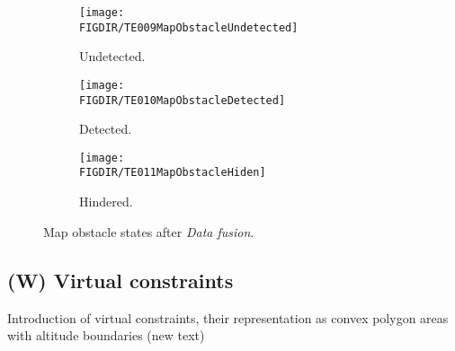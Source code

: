     
    \begin{figure}[H]
        \begin{subfigure}{0.32\textwidth}
            \texttt{[image: \\FIGDIR/TE009MapObstacleUndetected]} 
            \caption{Undetected.}
            \label{fig:undetectedMapObstalce.}
        \end{subfigure}
        \begin{subfigure}{0.32\textwidth}
            \texttt{[image: \\FIGDIR/TE010MapObstacleDetected]} 
            \caption{Detected.}
            \label{fig:detectedMapObstacle}
        \end{subfigure}
        \begin{subfigure}{0.32\textwidth}
            \texttt{[image: \\FIGDIR/TE011MapObstacleHiden]}
            \caption{Hindered.}
            \label{fig:hinderedMapObstacle}
        \end{subfigure}
        \caption{Map obstacle states after \emph{Data fusion}.}
        \label{fig:mapObstacleStatesAfterDataFusion}
    \end{figure}

\subsection{(W) Virtual constraints}\label{s:virtualConstraints}
    \noindent Introduction of virtual constraints, their representation as convex polygon areas with altitude boundaries (new text)
    

